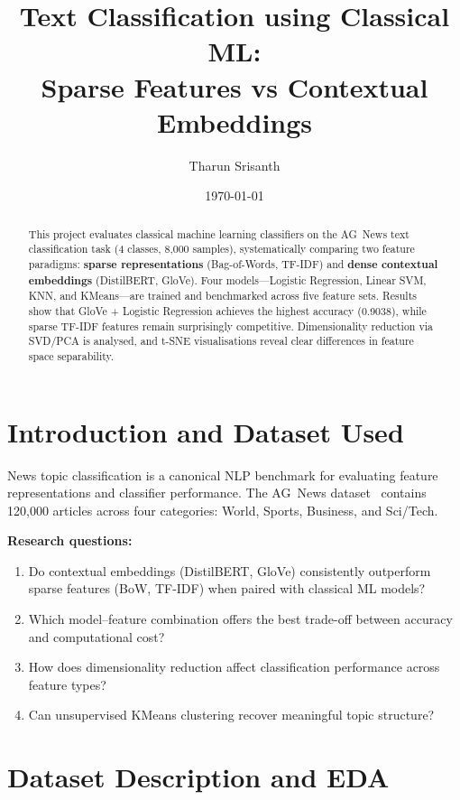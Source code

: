 \documentclass[11pt, a4paper, twocolumn]{article}
\title{\textbf{Text Classification using Classical ML:\\Sparse Features vs Contextual Embeddings}}
\author{Tharun Srisanth}
\date{\today}
\begin{document}
\maketitle

\begin{abstract}
This project evaluates classical machine learning classifiers on the AG~News text classification task (4 classes, 8,000 samples), systematically comparing two feature paradigms: \textbf{sparse representations} (Bag-of-Words, TF-IDF) and \textbf{dense contextual embeddings} (DistilBERT, GloVe). Four models---Logistic Regression, Linear SVM, KNN, and KMeans---are trained and benchmarked across five feature sets. Results show that GloVe + Logistic Regression achieves the highest accuracy (0.9038), while sparse TF-IDF features remain surprisingly competitive. Dimensionality reduction via SVD/PCA is analysed, and t-SNE visualisations reveal clear differences in feature space separability.
\end{abstract}

\section{Introduction and Dataset Used}

News topic classification is a canonical NLP benchmark for evaluating feature representations and classifier performance. The AG~News dataset~\cite{agnews} contains 120,000 articles across four categories: World, Sports, Business, and Sci/Tech.

\textbf{Research questions:}
\begin{enumerate}[leftmargin=*,topsep=2pt,itemsep=1pt]
    \item Do contextual embeddings (DistilBERT, GloVe) consistently outperform sparse features (BoW, TF-IDF) when paired with classical ML models?
    \item Which model--feature combination offers the best trade-off between accuracy and computational cost?
    \item How does dimensionality reduction affect classification performance across feature types?
    \item Can unsupervised KMeans clustering recover meaningful topic structure?
\end{enumerate}

\section{Dataset Description and EDA}
\end{document}
